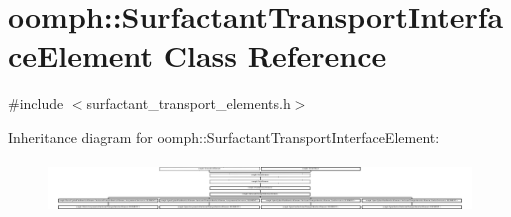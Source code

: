 \hypertarget{classoomph_1_1SurfactantTransportInterfaceElement}{}\section{oomph\+:\+:Surfactant\+Transport\+Interface\+Element Class Reference}
\label{classoomph_1_1SurfactantTransportInterfaceElement}


{\ttfamily \#include $<$surfactant\+\_\+transport\+\_\+elements.\+h$>$}

Inheritance diagram for oomph\+:\+:Surfactant\+Transport\+Interface\+Element\+:\begin{figure}[H]
\begin{center}
\leavevmode
\includegraphics[height=1.390071cm]{classoomph_1_1SurfactantTransportInterfaceElement}
\end{center}
\end{figure}
